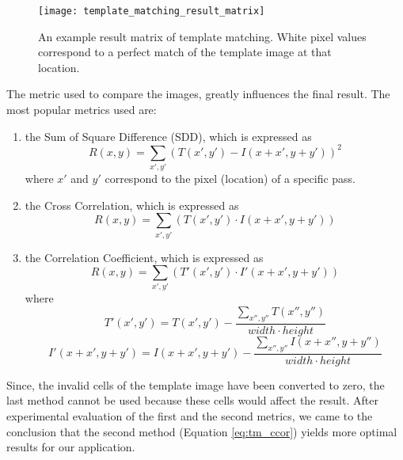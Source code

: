 \begin{itemize}
        \begin{figure}[h!]
            \centering
            \texttt{[image: template\_matching\_result\_matrix]}
            \caption[Template matching result matrix]{
                An example result matrix of template matching.
                White pixel values correspond to a perfect match of
                the template image at that location.
            }
            \label{fig:template_matching_result_matrix}
        \end{figure}

        The metric used to compare the images, greatly influences the final
        result. The most popular metrics used are:
        \begin{enumerate}
            \item the Sum of Square Difference (SDD), which is expressed as
                \begin{equation}
                    R(x, y) = \sum_{x', y'} (T(x', y') - I(x + x', y + y'))^2
                \end{equation}
                where $x'$ and $y'$ correspond to the pixel (location) of
                a specific pass.
            \item the Cross Correlation, which is expressed as
                \begin{equation} \label{eq:tm_ccor}
                    R(x, y) = \sum_{x', y'} (T(x', y') \cdot I(x + x', y + y'))
                \end{equation}
            \item the Correlation Coefficient, which is expressed as
                \begin{equation}
                    R(x, y) =
                    \sum_{x', y'} (T'(x', y') \cdot I'(x + x', y + y'))
                \end{equation}
                where
                \begin{equation}
                    T'(x', y') = T(x', y') -
                    \frac{\sum_{x'',y''}T(x'', y'')}{width \cdot height}
                \end{equation}
                \begin{equation}
                    I'(x + x', y + y') = I(x + x', y + y') -
                    \frac{\sum_{x'',y''}I(x + x'',y + y'')}{width \cdot height}
                \end{equation}
        \end{enumerate}

        Since, the invalid cells of the template image have been converted
        to zero, the last method cannot be used because these cells would
        affect the result. After experimental evaluation of the first and
        the second metrics, we came to the conclusion that the second
        method (Equation \ref{eq:tm_ccor}) yields more optimal results
        for our application.


\end{itemize}
